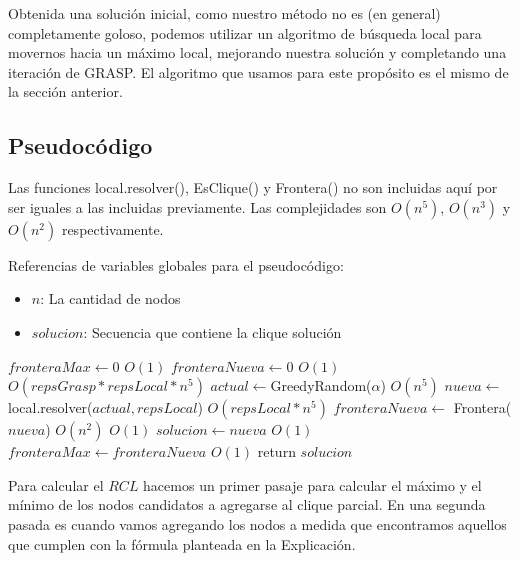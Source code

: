 Obtenida una solución inicial, como nuestro método no es (en general) completamente goloso, podemos utilizar un algoritmo de búsqueda local para movernos hacia un máximo local, mejorando nuestra solución y completando una iteración de GRASP. El algoritmo que usamos para este propósito es el mismo de la sección anterior.

\subsection{Pseudocódigo}

Las funciones local.resolver(), EsClique() y Frontera() no son incluidas aquí por ser iguales a las incluidas previamente. Las complejidades son $O(n^5)$, $O(n^3)$ y $O(n^2)$ respectivamente.

Referencias de variables globales para el pseudocódigo:
\begin{itemize}
    \item $n$: La cantidad de nodos
    \item $solucion$: Secuencia que contiene la clique solución
\end{itemize}

\begin{algorithm}[H]
\begin{algorithmic}
    \State $fronteraMax \gets 0$                    \Comment $O(1)$
    \State $fronteraNueva \gets 0$                  \Comment $O(1)$
                               \Comment $O(repsGrasp * repsLocal * n^5)$
        \State $actual \gets $GreedyRandom($\alpha$)              \Comment $O(n^5)$
        \State $nueva \gets$ local.resolver($actual, repsLocal$)  \Comment $O(repsLocal * n^5)$
        \State $fronteraNueva \gets$ Frontera($nueva$)            \Comment $O(n^2)$
                             \Comment $O(1)$
            \State $solucion \gets nueva$                       \Comment $O(1)$
            \State $fronteraMax \gets fronteraNueva$            \Comment $O(1)$
        \EndIf
    \EndFor
    \State return $solucion$
\EndFunction
\end{algorithmic}
\end{algorithm}
Para calcular el $RCL$ hacemos un primer pasaje para calcular el máximo y el mínimo de los nodos candidatos a agregarse al clique parcial. En una segunda pasada es cuando vamos agregando los nodos a medida que encontramos aquellos que cumplen con la fórmula planteada en la Explicación.

